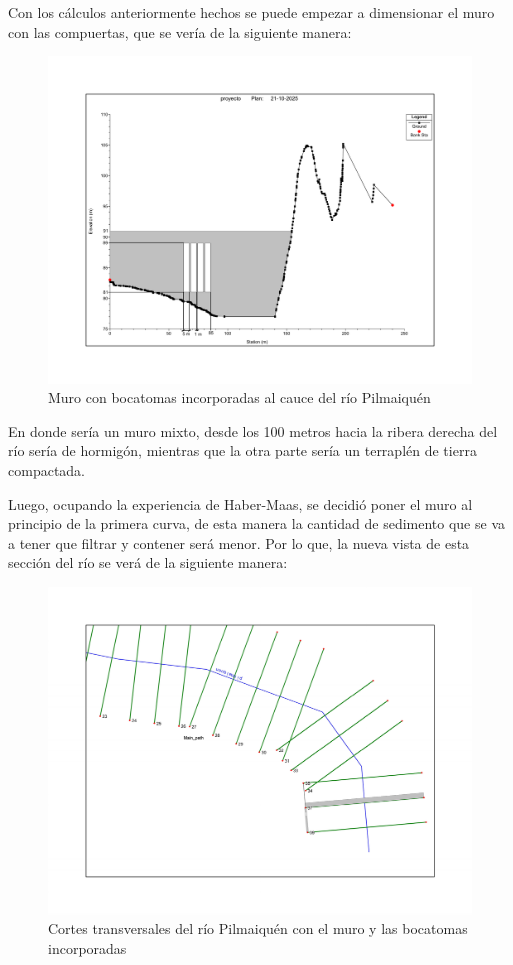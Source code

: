 \documentclass{article} %
\begin{document}
Con los cálculos anteriormente hechos se puede empezar a dimensionar el muro con las compuertas, que se vería de la siguiente manera:

\begin{figure}[H]
    \centering
    \includegraphics[width=0.8\linewidth]{imagenes/muro.pdf}
    \caption{Muro con bocatomas incorporadas al cauce del río Pilmaiquén}
\end{figure}

En donde sería un muro mixto, desde los 100 metros hacia la ribera derecha del río sería de hormigón, mientras que la otra parte sería un terraplén de tierra compactada.

Luego, ocupando la experiencia de Haber-Maas, se decidió poner el muro al principio de la primera curva, de esta manera la cantidad de sedimento que se va a tener que filtrar y contener será menor. Por lo que, la nueva vista de esta sección del río se verá de la siguiente manera:
\begin{figure}[H]
    \centering
    \includegraphics[width=0.6\linewidth]{imagenes/rio.pdf}
    \caption{Cortes transversales del río Pilmaiquén con el muro y las bocatomas incorporadas}
\end{figure}
\end{document}
